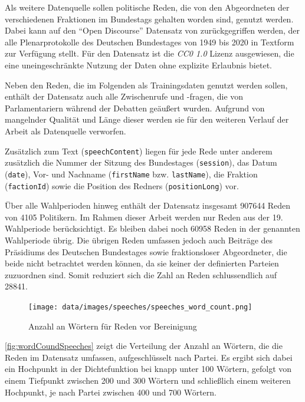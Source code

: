 Als weitere Datenquelle sollen politische Reden, die von den Abgeordneten der verschiedenen Fraktionen im Bundestags gehalten worden sind, genutzt werden. Dabei kann auf den \enquote{Open Discourse} Datensatz von \textcite{richter_open_2021} zurückgegriffen werden, der alle Plenarprotokolle des Deutschen Bundestages von \num{1949} bis \num{2020} in Textform zur Verfügung stellt. Für den Datensatz ist die \textit{CC0 1.0} Lizenz ausgewiesen, die eine uneingeschränkte Nutzung der Daten ohne explizite Erlaubnis bietet.

Neben den Reden, die im Folgenden als Trainingsdaten genutzt werden sollen, enthält der Datensatz auch alle Zwischenrufe und -fragen, die von Parlamentariern während der Debatten geäußert wurden. Aufgrund von mangelnder Qualität und Länge dieser werden sie für den weiteren Verlauf der Arbeit als Datenquelle verworfen.

Zusätzlich zum Text (\texttt{speechContent}) liegen für jede Rede unter anderem zusätzlich die Nummer der Sitzung des Bundestages (\texttt{session}), das Datum (\texttt{date}), Vor- und Nachname (\texttt{firstName} bzw. \texttt{lastName}), die Fraktion (\texttt{factionId}) sowie die Position des Redners (\texttt{positionLong}) vor.

Über alle Wahlperioden hinweg enthält der Datensatz insgesamt \num{907644} Reden von \num{4105} Politikern. Im Rahmen dieser Arbeit werden nur Reden aus der 19. Wahlperiode berücksichtigt. Es bleiben dabei noch \num{60958} Reden in der genannten Wahlperiode übrig. Die übrigen Reden umfassen jedoch auch Beiträge des Präsidiums des Deutschen Bundestages sowie fraktionsloser Abgeordneter, die beide nicht betrachtet werden können, da sie keiner der definierten Parteien zuzuordnen sind. Somit reduziert sich die Zahl an Reden schlussendlich auf \num{28841}.

\begin{figure}[H]
    \centering
    \texttt{[image: data/images/speeches/speeches\_word\_count.png]}
    \caption{Anzahl an Wörtern für Reden vor Bereinigung} \label{fig:wordCoundSpeeches}
\end{figure}

\autoref{fig:wordCoundSpeeches} zeigt die Verteilung der Anzahl an Wörtern, die die Reden im Datensatz umfassen, aufgeschlüsselt nach Partei. Es ergibt sich dabei ein Hochpunkt in der Dichtefunktion bei knapp unter 100 Wörtern, gefolgt von einem Tiefpunkt zwischen \num{200} und \num{300} Wörtern und schließlich einem weiteren Hochpunkt, je nach Partei zwischen 400 und 700 Wörtern.

